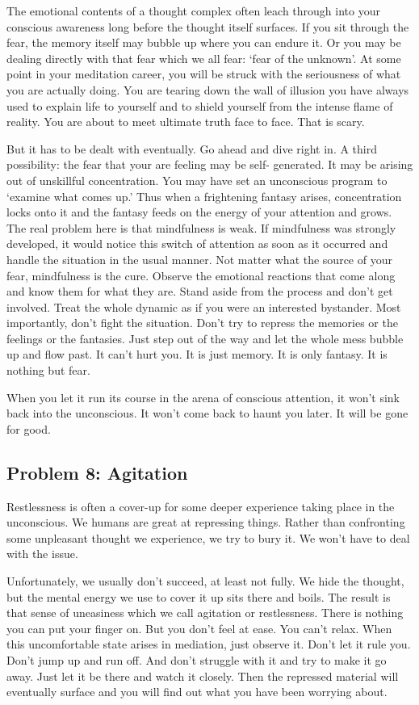 The emotional contents of a thought complex often leach through into your
conscious awareness long before the thought itself surfaces. If you sit through
the fear, the memory itself may bubble up where you can endure it. Or you may be
dealing directly with that fear which we all fear: `fear of the unknown'. At
some point in your meditation career, you will be struck with the seriousness of
what you are actually doing. You are tearing down the wall of illusion you have
always used to explain life to yourself and to shield yourself from the intense
flame of reality. You are about to meet ultimate truth face to face. That is
scary.

But it has to be dealt with eventually. Go ahead and dive right in.  A third
possibility: the fear that your are feeling may be self- generated. It may be
arising out of unskillful concentration. You may have set an unconscious program
to `examine what comes up.' Thus when a frightening fantasy arises,
concentration locks onto it and the fantasy feeds on the energy of your
attention and grows. The real problem here is that mindfulness is weak. If
mindfulness was strongly developed, it would notice this switch of attention as
soon as it occurred and handle the situation in the usual manner. Not matter
what the source of your fear, mindfulness is the cure. Observe the emotional
reactions that come along and know them for what they are. Stand aside from the
process and don't get involved. Treat the whole dynamic as if you were an
interested bystander. Most importantly, don't fight the situation. Don't try to
repress the memories or the feelings or the fantasies.  Just step out of the way
and let the whole mess bubble up and flow past. It can't hurt you. It is just
memory. It is only fantasy. It is nothing but fear.

When you let it run its course in the arena of conscious attention, it won't
sink back into the unconscious. It won't come back to haunt you later. It will
be gone for good.

\subsection*{Problem 8: Agitation} Restlessness is often a cover-up for some deeper experience
taking place in the unconscious. We humans are great at repressing things.
Rather than confronting some unpleasant thought we experience, we try to bury
it. We won't have to deal with the issue.

Unfortunately, we usually don't succeed, at least not fully. We hide the
thought, but the mental energy we use to cover it up sits there and boils. The
result is that sense of uneasiness which we call agitation or restlessness.
There is nothing you can put your finger on. But you don't feel at ease. You
can't relax. When this uncomfortable state arises in mediation, just observe it.
Don't let it rule you. Don't jump up and run off. And don't struggle with it and
try to make it go away. Just let it be there and watch it closely. Then the
repressed material will eventually surface and you will find out what you have
been worrying about.

